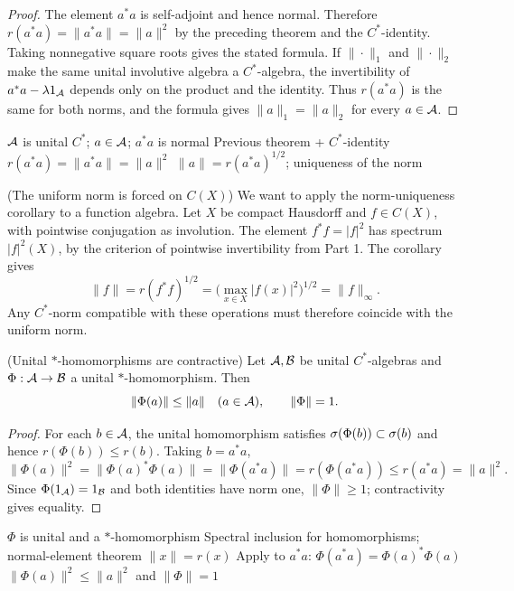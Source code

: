 \begin{proof}[Proof]
The element $a^*a$ is self-adjoint and hence normal. Therefore
$r(a^*a)=\|a^*a\|=\|a\|^2$ by the preceding theorem and the $C^*$-identity.
Taking nonnegative square roots gives the stated formula.
If $\|\cdot\|_1$ and $\|\cdot\|_2$ make the same unital involutive algebra a
$C^*$-algebra, the invertibility of $a^*a-\lambda1_\mathcal A$ depends only on the
product and the identity. Thus $r(a^*a)$ is the same for both norms, and the
formula gives $\|a\|_1=\|a\|_2$ for every $a\in\mathcal A$.
\end{proof}

\proofdiagram
{$\mathcal A$ is unital $C^*$; $a\in\mathcal A$; $a^*a$ is normal}
{Previous theorem + $C^*$-identity}
{$r(a^*a)=\|a^*a\|=\|a\|^2$}
{$\|a\|=r(a^*a)^{1/2}$; uniqueness of the norm}

\begin{cthejemplo}{(The uniform norm is forced on $C(X)$)}
We want to apply the norm-uniqueness corollary to a function algebra.
Let $X$ be compact Hausdorff and $f\in C(X)$, with pointwise conjugation
as involution. The element $f^*f=|f|^2$ has spectrum $|f|^2(X)$,
by the criterion of pointwise invertibility from Part 1. The corollary gives
\[
 \|f\|=r(f^*f)^{1/2}
 =\bigl(\max_{x\in X}|f(x)|^2\bigr)^{1/2}
 =\|f\|_\infty.
\]
Any $C^*$-norm compatible with these operations must therefore
coincide with the uniform norm.
\end{cthejemplo}

\begin{cthteorema}{(Unital $*$-homomorphisms are contractive)}
Let $\mathcal A,\mathcal B$ be unital $C^*$-algebras and $\Phi:\mathcal A\to\mathcal B$ a unital $*$-homomorphism. Then
\[
 \|\Phi(a)\|\le\|a\|\quad(a\in\mathcal A),
 \qquad \|\Phi\|=1.
\]
\end{cthteorema}

\begin{proof}[Proof]
For each $b\in\mathcal A$, the unital homomorphism satisfies
$\sigma(\Phi(b))\subset\sigma(b)$ and hence
$r(\Phi(b))\le r(b)$. Taking $b=a^*a$,
\[
\|\Phi(a)\|^2
=\|\Phi(a)^*\Phi(a)\|
=\|\Phi(a^*a)\|
=r(\Phi(a^*a))
\le r(a^*a)=\|a\|^2.
\]
Since $\Phi(1_\mathcal A)=1_\mathcal B$ and both identities have norm one,
$\|\Phi\|\ge1$; contractivity gives equality.
\end{proof}

\proofdiagram
{$\Phi$ is unital and a $*$-homomorphism}
{Spectral inclusion for homomorphisms; normal-element theorem $\|x\|=r(x)$}
{Apply to $a^*a$: $\Phi(a^*a)=\Phi(a)^*\Phi(a)$}
{$\|\Phi(a)\|^2\le\|a\|^2$ and $\|\Phi\|=1$}

